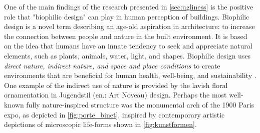 \documentclass{article}
\begin{document}
\begin{multicols}{2}

One of the main findings of the research presented in \cref{sec:ugliness} is the positive role that "biophilic design" can play in human perception of buildings. Biophilic design is a novel term describing an age-old aspiration in architecture: to increase the connection between people and nature in the built environment. It is based on the idea that humans have an innate tendency to seek and appreciate natural elements, such as plants, animals, water, light, and shapes. Biophilic design uses \textit{direct nature, indirect nature, and space and place conditions} to create environments that are beneficial for human health, well-being, and sustainability \cite{kellert_practice_2015}. One example of the indirect use of nature is provided by the lavish floral ornamentation in Jugendstil (en.: Art Noveau) design. Perhaps the most well-known fully nature-inspired structure was the monumental arch of the 1900 Paris expo, as depicted in \cref{fig:porte_binet}, inspired by contemporary artistic depictions of microscopic life-forms shown in \cref{fig:kunstformen}.
    
\end{multicols}
\vspace{-5mm}
\end{document}
